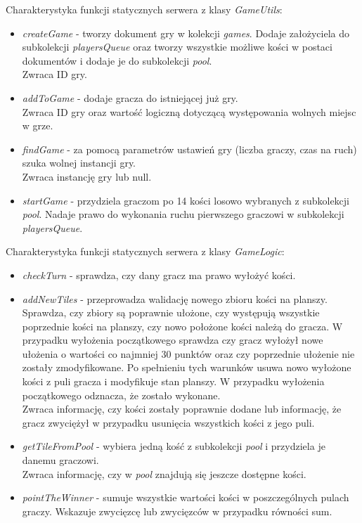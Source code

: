 Charakterystyka funkcji statycznych serwera z klasy \emph{GameUtils}:
\begin{itemize}
	\item \emph{createGame} - tworzy dokument gry w kolekcji \emph{games}. Dodaje założyciela do subkolekcji \emph{playersQueue} oraz tworzy wszystkie możliwe kości w postaci dokumentów i dodaje je do subkolekcji \emph{pool}. \\
	Zwraca ID gry.
	\item \emph{addToGame} - dodaje gracza do istniejącej już gry. \\
	Zwraca ID gry oraz wartość logiczną dotyczącą występowania wolnych miejsc w grze.
	\item \emph{findGame} -  za pomocą parametrów ustawień gry (liczba graczy, czas na ruch) szuka wolnej instancji gry. \\
	Zwraca instancję gry lub null.
	\item \emph{startGame} -  przydziela graczom po 14 kości losowo wybranych z subkolekcji \emph{pool}. Nadaje prawo do wykonania ruchu pierwszego graczowi w subkolekcji \emph{playersQueue}. \\
\end{itemize}

Charakterystyka funkcji statycznych serwera z klasy \emph{GameLogic}:
\begin{itemize}
	\item \emph{checkTurn} - sprawdza, czy dany gracz ma prawo wyłożyć kości.
	\item \emph{addNewTiles} - przeprowadza walidację nowego zbioru kości na planszy. Sprawdza, czy zbiory są poprawnie ułożone, czy występują wszystkie poprzednie kości na planszy, czy nowo położone kości należą do gracza. W przypadku wyłożenia początkowego sprawdza czy gracz wyłożył nowe ułożenia o wartości co najmniej 30 punktów oraz czy poprzednie ułożenie nie zostały zmodyfikowane. Po spełnieniu tych warunków usuwa nowo wyłożone kości z puli gracza i modyfikuje stan planszy. W przypadku wyłożenia początkowego odznacza, że zostało wykonane. \\
	Zwraca informację, czy kości zostały poprawnie dodane lub informację, że gracz zwyciężył w przypadku usunięcia wszystkich kości z jego puli.
	\item \emph{getTileFromPool} - wybiera jedną kość z subkolekcji \emph{pool} i przydziela je danemu graczowi. \\
	Zwraca informację, czy w \emph{pool} znajdują się jeszcze dostępne kości.
	\item \emph{pointTheWinner} -  sumuje wszystkie wartości kości w poszczególnych pulach graczy. Wskazuje zwycięzcę lub zwycięzców w przypadku równości sum. \\
\end{itemize}

